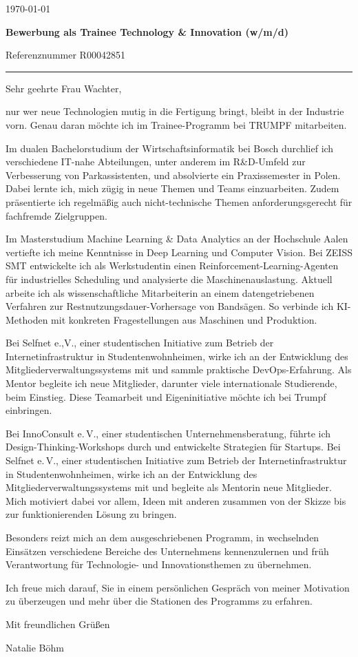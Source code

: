 \documentclass[11pt,a4paper]{article}
\newcommand{\Briefdatum}{\today}
\begin{document}
\color{black}

{\raggedleft \Briefdatum\par}
\vspace{5mm}
{\large\bfseries\textcolor{CVPrimary}{Bewerbung als Trainee Technology \& Innovation (w/m/d)}}\par
{\small Referenznummer R00042851}\par
{\color{CVAccent}\rule{\linewidth}{0.6pt}}\par
\vspace{1mm}

Sehr geehrte Frau Wachter, 

nur wer neue Technologien mutig in die Fertigung bringt, bleibt in der Industrie vorn. Genau daran möchte ich im Trainee-Programm bei TRUMPF mitarbeiten.

Im dualen Bachelorstudium der Wirtschaftsinformatik bei Bosch durchlief ich verschiedene IT-nahe Abteilungen, unter anderem im R\&D-Umfeld zur Verbesserung von Parkassistenten, und absolvierte ein Praxissemester in Polen. Dabei lernte ich, mich zügig in neue Themen und Teams einzuarbeiten. Zudem präsentierte ich regelmäßig auch nicht-technische Themen anforderungsgerecht für fachfremde Zielgruppen.

Im Masterstudium Machine Learning \& Data Analytics an der Hochschule Aalen vertiefte ich meine Kenntnisse in Deep Learning und Computer Vision. Bei ZEISS SMT entwickelte ich als Werkstudentin einen Reinforcement-Learning-Agenten für industrielles Scheduling und analysierte die Maschinenauslastung. Aktuell arbeite ich als wissenschaftliche Mitarbeiterin an einem datengetriebenen Verfahren zur Restnutzungsdauer-Vorhersage von Bandsägen. So verbinde ich KI-Methoden mit konkreten Fragestellungen aus Maschinen und Produktion.

Bei Selfnet e.,V., einer studentischen Initiative zum Betrieb der Internetinfrastruktur in Studentenwohnheimen, wirke ich an der Entwicklung des Mitgliederverwaltungssystems mit und sammle praktische DevOps-Erfahrung. Als Mentor begleite ich neue Mitglieder, darunter viele internationale Studierende, beim Einstieg. Diese Teamarbeit und Eigeninitiative möchte ich bei Trumpf einbringen.

Bei InnoConsult e.\,V., einer studentischen Unternehmensberatung, führte ich Design-Thinking-Workshops durch und entwickelte Strategien für Startups. Bei Selfnet e.\,V., einer studentischen Initiative zum Betrieb der Internetinfrastruktur in Studentenwohnheimen, wirke ich an der Entwicklung des Mitgliederverwaltungssystems mit und begleite als Mentorin neue Mitglieder. Mich motiviert dabei vor allem, Ideen mit anderen zusammen von der Skizze bis zur funktionierenden Lösung zu bringen.

 Besonders reizt mich an dem ausgeschriebenen Programm, in wechselnden Einsätzen verschiedene Bereiche des Unternehmens kennenzulernen und früh Verantwortung für Technologie- und Innovationsthemen zu übernehmen.

Ich freue mich darauf, Sie in einem persönlichen Gespräch von meiner Motivation zu überzeugen und mehr über die Stationen des Programms zu erfahren.

Mit freundlichen Grüßen

\vspace{6mm}
Natalie Böhm
\end{document}
